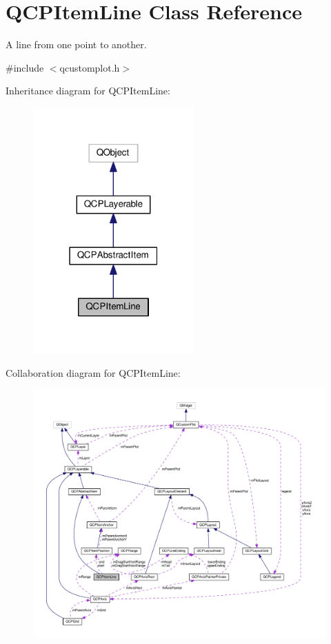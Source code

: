 \hypertarget{classQCPItemLine}{}\section{Q\+C\+P\+Item\+Line Class Reference}
\label{classQCPItemLine}


A line from one point to another.  




{\ttfamily \#include $<$qcustomplot.\+h$>$}



Inheritance diagram for Q\+C\+P\+Item\+Line\+:
\nopagebreak
\begin{figure}[H]
\begin{center}
\leavevmode
\includegraphics[width=175pt]{classQCPItemLine__inherit__graph}
\end{center}
\end{figure}


Collaboration diagram for Q\+C\+P\+Item\+Line\+:
\nopagebreak
\begin{figure}[H]
\begin{center}
\leavevmode
\includegraphics[width=350pt]{classQCPItemLine__coll__graph}
\end{center}
\end{figure}
